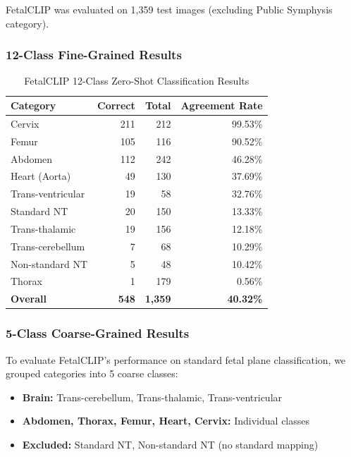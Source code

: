 \documentclass[11pt,a4paper]{article}
\begin{document}
FetalCLIP was evaluated on 1,359 test images (excluding Public Symphysis category).

\subsubsection{12-Class Fine-Grained Results}

\begin{table}[H]
\centering
\caption{FetalCLIP 12-Class Zero-Shot Classification Results}
\begin{tabular}{lrrr}
\toprule
\textbf{Category} & \textbf{Correct} & \textbf{Total} & \textbf{Agreement Rate} \\
\midrule
Cervix & 211 & 212 & 99.53\% \\
Femur & 105 & 116 & 90.52\% \\
Abdomen & 112 & 242 & 46.28\% \\
Heart (Aorta) & 49 & 130 & 37.69\% \\
Trans-ventricular & 19 & 58 & 32.76\% \\
Standard NT & 20 & 150 & 13.33\% \\
Trans-thalamic & 19 & 156 & 12.18\% \\
Trans-cerebellum & 7 & 68 & 10.29\% \\
Non-standard NT & 5 & 48 & 10.42\% \\
Thorax & 1 & 179 & 0.56\% \\
\midrule
\textbf{Overall} & \textbf{548} & \textbf{1,359} & \textbf{40.32\%} \\
\bottomrule
\end{tabular}
\end{table}

\subsubsection{5-Class Coarse-Grained Results}

To evaluate FetalCLIP's performance on standard fetal plane classification, we grouped categories into 5 coarse classes:

\begin{itemize}
    \item \textbf{Brain:} Trans-cerebellum, Trans-thalamic, Trans-ventricular
    \item \textbf{Abdomen, Thorax, Femur, Heart, Cervix:} Individual classes
    \item \textbf{Excluded:} Standard NT, Non-standard NT (no standard mapping)
\end{itemize}
\end{document}
